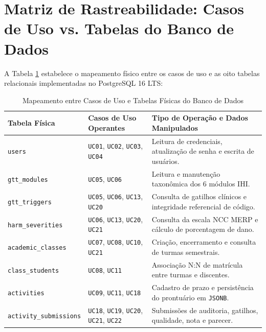 \section{Matriz de Rastreabilidade: Casos de Uso vs. Tabelas do Banco de Dados}
\label{sec_matriz_uc_banco}

A Tabela \ref{tab_rastreabilidade_uc_banco} estabelece o mapeamento físico entre os casos de uso e as oito tabelas relacionais implementadas no PostgreSQL 16 LTS:

\begin{table}[!ht]
\centering
\caption{Mapeamento entre Casos de Uso e Tabelas Físicas do Banco de Dados}
\label{tab_rastreabilidade_uc_banco}
\footnotesize
\begin{tabularx}{\textwidth}{p{4.2cm} p{3.5cm} X}
\toprule
\textbf{Tabela Física} & \textbf{Casos de Uso Operantes} & \textbf{Tipo de Operação e Dados Manipulados} \\
\midrule
\texttt{users} & \texttt{UC01}, \texttt{UC02}, \texttt{UC03}, \texttt{UC04} & Leitura de credenciais, atualização de senha e escrita de usuários. \\
\texttt{gtt\_modules} & \texttt{UC05}, \texttt{UC06} & Leitura e manutenção taxonômica dos 6 módulos IHI. \\
\texttt{gtt\_triggers} & \texttt{UC05}, \texttt{UC06}, \texttt{UC13}, \texttt{UC20} & Consulta de gatilhos clínicos e integridade referencial de código. \\
\texttt{harm\_severities} & \texttt{UC06}, \texttt{UC13}, \texttt{UC20}, \texttt{UC21} & Consulta da escala NCC MERP e cálculo de porcentagem de dano. \\
\texttt{academic\_classes} & \texttt{UC07}, \texttt{UC08}, \texttt{UC10}, \texttt{UC21} & Criação, encerramento e consulta de turmas semestrais. \\
\texttt{class\_students} & \texttt{UC08}, \texttt{UC11} & Associação N:N de matrícula entre turmas e discentes. \\
\texttt{activities} & \texttt{UC09}, \texttt{UC11}, \texttt{UC18} & Cadastro de prazo e persistência do prontuário em \texttt{JSONB}. \\
\texttt{activity\_submissions} & \texttt{UC18}, \texttt{UC19}, \texttt{UC20}, \texttt{UC21}, \texttt{UC22} & Submissões de auditoria, gatilhos, qualidade, nota e parecer. \\
\bottomrule
\end{tabularx}
\end{table}
